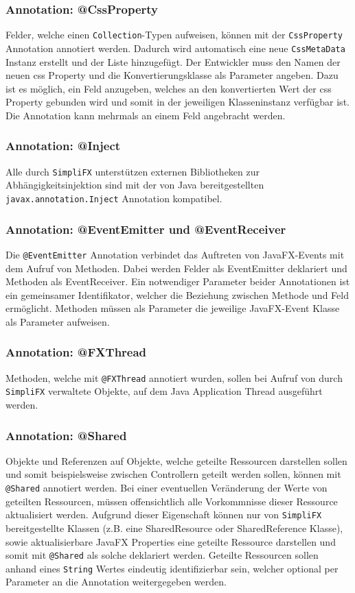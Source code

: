 \subsubsection{Annotation: @CssProperty}
Felder, welche einen \texttt{Collection}-Typen aufweisen, können mit der \texttt{CssProperty} Annotation annotiert werden. Dadurch wird automatisch eine neue \texttt{CssMetaData} Instanz erstellt und der Liste hinzugefügt. Der Entwickler muss den Namen der neuen \ac{css} Property und die Konvertierungsklasse als Parameter angeben. Dazu ist es möglich, ein Feld anzugeben, welches an den konvertierten Wert der \ac{css} Property gebunden wird und somit in der jeweiligen Klasseninstanz verfügbar ist. Die Annotation kann mehrmals an einem Feld angebracht werden.
\subsubsection{Annotation: @Inject}
Alle durch \texttt{SimpliFX} unterstützen externen Bibliotheken zur Abhängigkeitsinjektion sind mit der von Java bereitgestellten \texttt{javax.annotation.Inject} Annotation kompatibel. 
\subsubsection{Annotation: @EventEmitter und @EventReceiver}
Die \texttt{@EventEmitter} Annotation verbindet das Auftreten von JavaFX-Events mit dem Aufruf von Methoden. Dabei werden Felder als EventEmitter deklariert und Methoden als EventReceiver. Ein notwendiger Parameter beider Annotationen ist ein gemeinsamer Identifikator, welcher die Beziehung zwischen Methode und Feld ermöglicht. Methoden müssen als Parameter die jeweilige JavaFX-Event Klasse als Parameter aufweisen.
\subsubsection{Annotation: @FXThread}
Methoden, welche mit \texttt{@FXThread} annotiert wurden, sollen bei Aufruf von durch \texttt{SimpliFX} verwaltete Objekte, auf dem Java Application Thread ausgeführt werden.
\subsubsection{Annotation: @Shared}
Objekte und Referenzen auf Objekte, welche geteilte Ressourcen darstellen sollen und somit beispielsweise zwischen Controllern geteilt werden sollen, können mit \texttt{@Shared} annotiert werden. Bei einer eventuellen Veränderung der Werte von geteilten Ressourcen, müssen offensichtlich alle Vorkommnisse dieser Ressource aktualisiert werden. Aufgrund dieser Eigenschaft können nur von \texttt{SimpliFX} bereitgestellte Klassen (z.B. eine SharedResource oder SharedReference Klasse), sowie aktualisierbare JavaFX Properties eine geteilte Ressource darstellen und somit mit \texttt{@Shared} als solche deklariert werden. Geteilte Ressourcen sollen anhand eines \texttt{String} Wertes eindeutig identifizierbar sein, welcher optional per Parameter an die Annotation weitergegeben werden.
